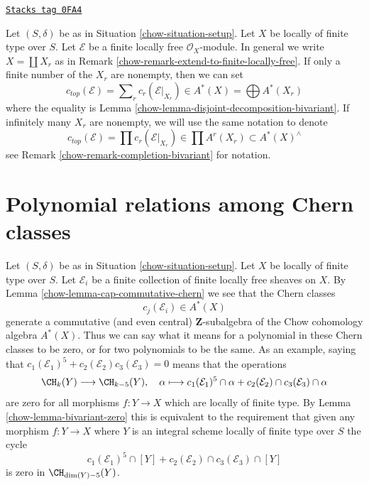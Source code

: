 \begin{remark}
\label{chow-remark-top-chern-class}
\href{https://stacks.math.columbia.edu/tag/0FA4}{\texttt{Stacks tag 0FA4}}

Let $(S, \delta)$ be as in Situation \ref{chow-situation-setup}. Let $X$
be locally of finite type over $S$. Let $\mathcal{E}$ be a
finite locally free $\mathcal{O}_X$-module. In general
we write $X = \coprod X_r$ as in
Remark \ref{chow-remark-extend-to-finite-locally-free}.
If only a finite number of the $X_r$ are nonempty, then
we can set
$$
c_{top}(\mathcal{E}) = \sum\nolimits_r c_r(\mathcal{E}|_{X_r})
\in A^*(X) = \bigoplus A^*(X_r)
$$
where the equality is Lemma \ref{chow-lemma-disjoint-decomposition-bivariant}.
If infinitely many $X_r$ are nonempty, we will use the same
notation to denote
$$
c_{top}(\mathcal{E}) = \prod c_r(\mathcal{E}|_{X_r})
\in \prod A^r(X_r) \subset A^*(X)^\wedge
$$
see Remark \ref{chow-remark-completion-bivariant} for notation.
\end{remark}

\section{Polynomial relations among Chern classes}
\label{chow-section-relations-chern-classes}
Let $(S, \delta)$ be as in Situation \ref{chow-situation-setup}. Let $X$ be locally
of finite type over $S$. Let $\mathcal{E}_i$ be a finite collection of finite
locally free sheaves on $X$. By Lemma \ref{chow-lemma-cap-commutative-chern}
we see that the Chern classes
$$
c_j(\mathcal{E}_i) \in A^*(X)
$$
generate a commutative (and even central) $\mathbf{Z}$-subalgebra of the
Chow cohomology algebra $A^*(X)$.
Thus we can say what it means for a polynomial in these Chern classes
to be zero, or for two polynomials to be the same. As an example, saying that
$c_1(\mathcal{E}_1)^5 + c_2(\mathcal{E}_2)c_3(\mathcal{E}_3) = 0$
means that the operations
$$
\CH_k(Y) \longrightarrow \CH_{k - 5}(Y), \quad
\alpha \longmapsto
c_1(\mathcal{E}_1)^5 \cap \alpha +
c_2(\mathcal{E}_2) \cap c_3(\mathcal{E}_3) \cap \alpha
$$
are zero for all morphisms $f : Y \to X$ which are locally of finite type.
By Lemma \ref{chow-lemma-bivariant-zero}
this is equivalent to the requirement that given any morphism
$f : Y \to X$  where $Y$ is an integral scheme
locally of finite type over $S$ the cycle
$$
c_1(\mathcal{E}_1)^5 \cap [Y] +
c_2(\mathcal{E}_2) \cap c_3(\mathcal{E}_3) \cap [Y]
$$
is zero in $\CH_{\dim(Y) - 5}(Y)$.

